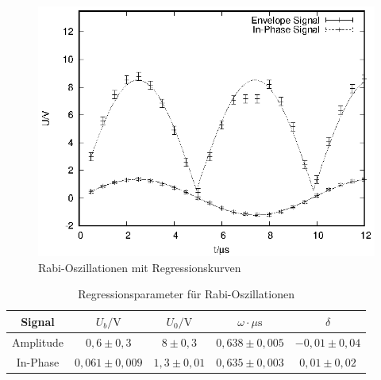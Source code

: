 \begin{figure}[h]
  \centering
  \includegraphics[width=0.75 \linewidth]{data/p402_443_data/rabi_f_1/rabi_1.eps}
  \caption{Rabi-Oszillationen mit Regressionskurven}
  \label{fig:rabi}
\end{figure}

\begin{table}[h]
  \centering
  \begin{tabular}{c c c c c}
    \toprule
    Signal & $U_b/\mathrm{V}$ & $U_0/\mathrm{V}$ & $\omega \cdot \mu\mathrm{s}$ & $\delta$ \\
    \midrule
    Amplitude & $0,6 \pm 0,3$ & $8 \pm 0,3$ & $0,638 \pm 0,005$ & $-0,01 \pm 0,04$ \\
    In-Phase & $0,061 \pm 0,009$ & $1,3 \pm 0,01$& $0,635 \pm 0,003$ & $0,01 \pm 0,02$ \\
    \bottomrule
  \end{tabular}
  \caption{Regressionsparameter für Rabi-Oszillationen}
  \label{tab:rabi}
\end{table}

